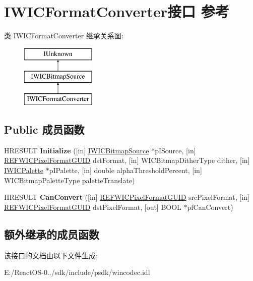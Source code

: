 \hypertarget{interface_i_w_i_c_format_converter}{}\section{I\+W\+I\+C\+Format\+Converter接口 参考}
\label{interface_i_w_i_c_format_converter}
类 I\+W\+I\+C\+Format\+Converter 继承关系图\+:\begin{figure}[H]
\begin{center}
\leavevmode
\includegraphics[height=3.000000cm]{interface_i_w_i_c_format_converter}
\end{center}
\end{figure}
\subsection*{Public 成员函数}
\begin{DoxyCompactItemize}
\item 
\mbox{\label{interface_i_w_i_c_format_converter_a20fdaa00c56547f42b08b68ed9b8f6db}} 
H\+R\+E\+S\+U\+LT {\bfseries Initialize} (\mbox{[}in\mbox{]} \hyperlink{interface_i_w_i_c_bitmap_source}{I\+W\+I\+C\+Bitmap\+Source} $\ast$p\+I\+Source, \mbox{[}in\mbox{]} \hyperlink{struct___g_u_i_d}{R\+E\+F\+W\+I\+C\+Pixel\+Format\+G\+U\+ID} dst\+Format, \mbox{[}in\mbox{]} W\+I\+C\+Bitmap\+Dither\+Type dither, \mbox{[}in\mbox{]} \hyperlink{interface_i_w_i_c_palette}{I\+W\+I\+C\+Palette} $\ast$p\+I\+Palette, \mbox{[}in\mbox{]} double alpha\+Threshold\+Percent, \mbox{[}in\mbox{]} W\+I\+C\+Bitmap\+Palette\+Type palette\+Translate)
\item 
\mbox{\label{interface_i_w_i_c_format_converter_a24d754e14a50730eb8b2196b773d32a6}} 
H\+R\+E\+S\+U\+LT {\bfseries Can\+Convert} (\mbox{[}in\mbox{]} \hyperlink{struct___g_u_i_d}{R\+E\+F\+W\+I\+C\+Pixel\+Format\+G\+U\+ID} src\+Pixel\+Format, \mbox{[}in\mbox{]} \hyperlink{struct___g_u_i_d}{R\+E\+F\+W\+I\+C\+Pixel\+Format\+G\+U\+ID} dst\+Pixel\+Format, \mbox{[}out\mbox{]} B\+O\+OL $\ast$pf\+Can\+Convert)
\end{DoxyCompactItemize}
\subsection*{额外继承的成员函数}


该接口的文档由以下文件生成\+:\begin{DoxyCompactItemize}
\item 
E\+:/\+React\+O\+S-\/0../sdk/include/psdk/wincodec.\+idl\end{DoxyCompactItemize}
